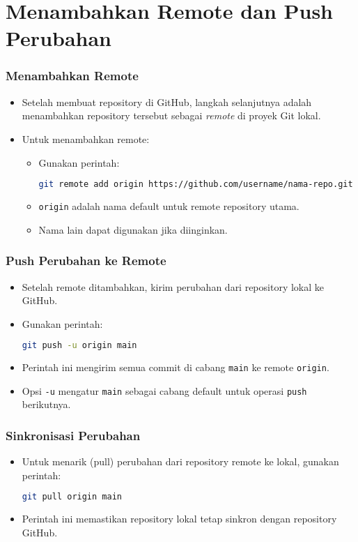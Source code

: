 \documentclass[aspectratio=169, table]{beamer}
\begin{document}
\section{Menambahkan Remote dan Push Perubahan}

\begin{frame}[fragile]
\frametitle{Menambahkan Remote}
\begin{itemize}
\item Setelah membuat repository di GitHub, langkah selanjutnya adalah menambahkan repository tersebut sebagai \textit{remote} di proyek Git lokal.
\item Untuk menambahkan remote:
\begin{itemize}
	\item Gunakan perintah:
	\begin{lstlisting}[language=bash]
		git remote add origin https://github.com/username/nama-repo.git
	\end{lstlisting}
	\item \texttt{origin} adalah nama default untuk remote repository utama.
	\item Nama lain dapat digunakan jika diinginkan.
\end{itemize}
\end{itemize}
\end{frame}

\begin{frame}[fragile]
\frametitle{Push Perubahan ke Remote}
\begin{itemize}
\item Setelah remote ditambahkan, kirim perubahan dari repository lokal ke GitHub.
\item Gunakan perintah:
\begin{lstlisting}[language=bash]
	git push -u origin main
\end{lstlisting}
\item Perintah ini mengirim semua commit di cabang \texttt{main} ke remote \texttt{origin}.
\item Opsi \texttt{-u} mengatur \texttt{main} sebagai cabang default untuk operasi \texttt{push} berikutnya.
\end{itemize}
\end{frame}

\begin{frame}[fragile]
\frametitle{Sinkronisasi Perubahan}
\begin{itemize}
\item Untuk menarik (pull) perubahan dari repository remote ke lokal, gunakan perintah:
\begin{lstlisting}[language=bash]
	git pull origin main
\end{lstlisting}
\item Perintah ini memastikan repository lokal tetap sinkron dengan repository GitHub.
\end{itemize}
\end{frame}
\end{document}
